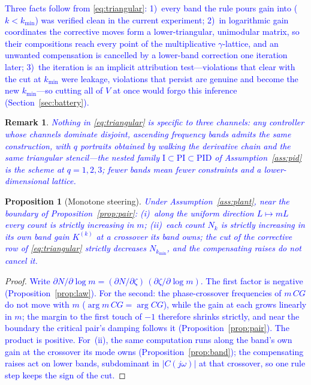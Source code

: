 \documentclass[final,3p,times,twocolumn]{elsarticle}
\newcommand{\revb}[1]{\textcolor{blue}{#1}} %
\newcommand{\revc}[1]{\textcolor{blue}{#1}} %
\newcommand{\revd}[1]{\textcolor{blue}{#1}} %
\newcommand{\reve}[1]{\textcolor{blue}{#1}} %
\newtheorem{proposition}{Proposition}
\newtheorem{remark}{Remark}
\begin{document}
\revc{Three facts follow from \eqref{eq:triangular}: 1)~every band
the rule pours gain into ($k < k_{\min}$) was verified clean in the
current experiment; 2)~in logarithmic gain coordinates the corrective
moves form a lower-triangular, unimodular matrix, so their compositions
reach every point of the multiplicative $\gamma$-lattice, and an
unwanted compensation is cancelled by a lower-band correction one
iteration later; 3)~the iteration is an implicit attribution
test---violations that clear with the cut at $k_{\min}$ were leakage,
violations that persist are genuine and become the new
$k_{\min}$---so cutting all of $V$ at once would forgo this inference
(Section~\ref{sec:battery}).}

\begin{remark}\label{rem:multichannel}
\reve{Nothing in \eqref{eq:triangular} is specific to three
channels: any controller whose channels dominate disjoint, ascending
frequency bands admits the same construction, with $q$ portraits
obtained by walking the derivative chain and the same triangular
stencil---the nested family
$\mathrm{I} \subset \mathrm{PI} \subset \mathrm{PID}$ of
Assumption~\ref{ass:pid} is the scheme at $q = 1, 2, 3$\reve{;
fewer bands mean fewer constraints and a lower-dimensional lattice.}}
\end{remark}

\begin{proposition}[Monotone steering]\label{prop:mono}
\revb{Under Assumption~\ref{ass:plant}, near the boundary of
Proposition~\ref{prop:pair}: (i)~along the uniform direction
$L\mapsto mL$ every count is strictly increasing in $m$; (ii)~each
count $N_k$ is strictly increasing in its own band gain
$K^{(k)}$ at a crossover its band owns; \revc{the cut of the
corrective row of \eqref{eq:triangular} strictly decreases
$N_{k_{\min}}$, and the compensating raises do not cancel it.}}
\end{proposition}

\begin{proof}
\revd{Write $\partial N/\partial\log m =
(\partial N/\partial\zeta)\,(\partial\zeta/\partial\log m)$. The first
factor is negative (Proposition~\ref{prop:law}). For the second: the
phase-crossover frequencies of $m\,CG$ do not move with $m$
\reve{($\arg m\,CG = \arg CG$)}, while the gain at each grows linearly
in $m$;
the margin to the first touch of $-1$ therefore shrinks strictly, and
near the boundary the critical pair's damping follows it
(Proposition~\ref{prop:pair}). The product
is positive. For~(ii), the same computation runs along the band's own
gain at the crossover its mode owns (Proposition~\ref{prop:band}); the
compensating raises act on lower bands, subdominant in $|C(j\omega)|$
at that crossover, so one rule step keeps the sign of the cut.}
\end{proof}
\end{document}
